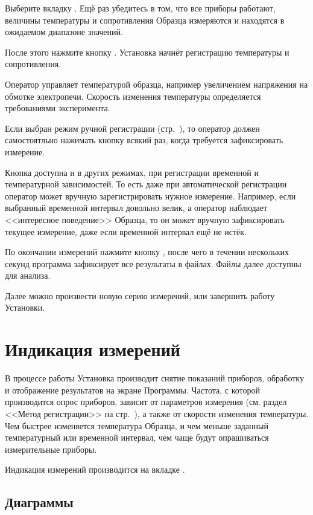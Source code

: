 \documentclass[12pt, a4paper, twocolumn]{report}
\begin{document}
Выберите вкладку . Ещё раз убедитесь в том, что все приборы работают, величины температуры и сопротивления Образца измеряются и находятся в ожидаемом диапазоне значений.

После этого нажмите кнопку . Установка начнёт регистрацию температуры и сопротивления.

Оператор управляет температурой образца, например увеличением напряжения на обмотке электропечи. Скорость изменения температуры определяется требованиями эксперимента.

Если выбран режим ручной регистрации (стр.~\pageref{sec_reg_type_manual}), то оператор должен самостоятльно нажимать кнопку \label{sec_manual} всякий раз, когда требуется зафиксировать измерение.

Кнопка  доступна и в других режимах, при регистрации временной и температурной зависимостей. То есть даже при автоматической регистрации оператор может вручную зарегистрировать нужное измерение. Например, если выбранный временной интервал довольно велик, а оператор наблюдает <<интересное поведение>> Образца, то он может вручную зафиксировать текущее измерение, даже если временной интервал ещё не истёк.

По окончании измерений нажмите кнопку , после чего в течении нескольких секунд программа зафиксирует все результаты в файлах. Файлы далее доступны для анализа.

Далее можно произвести новую серию измерений, или завершить работу Установки.

\section{Индикация измерений}

В процессе работы Установка производит снятие показаний приборов, обработку и отображение результатов на экране Программы. Частота, с которой производится опрос приборов, зависит от параметров измерения (см. раздел <<Метод регистрации>> на стр.~\pageref{sec_reg_method}), а также от скорости изменения температуры. Чем быстрее изменяется температура Образца, и чем меньше заданный температурный или временной интервал, чем чаще будут опрашиваться измерительные приборы.

Индикация измерений производится на вкладке .

\subsection{Диаграммы}
\end{document}
